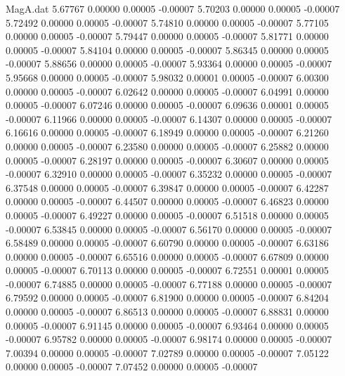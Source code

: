 \begin{filecontents}{MagA.dat}
   5.67767    0.00000    0.00005   -0.00007
   5.70203    0.00000    0.00005   -0.00007
   5.72492    0.00000    0.00005   -0.00007
   5.74810    0.00000    0.00005   -0.00007
   5.77105    0.00000    0.00005   -0.00007
   5.79447    0.00000    0.00005   -0.00007
   5.81771    0.00000    0.00005   -0.00007
   5.84104    0.00000    0.00005   -0.00007
   5.86345    0.00000    0.00005   -0.00007
   5.88656    0.00000    0.00005   -0.00007
   5.93364    0.00000    0.00005   -0.00007
   5.95668    0.00000    0.00005   -0.00007
   5.98032    0.00001    0.00005   -0.00007
   6.00300    0.00000    0.00005   -0.00007
   6.02642    0.00000    0.00005   -0.00007
   6.04991    0.00000    0.00005   -0.00007
   6.07246    0.00000    0.00005   -0.00007
   6.09636    0.00001    0.00005   -0.00007
   6.11966    0.00000    0.00005   -0.00007
   6.14307    0.00000    0.00005   -0.00007
   6.16616    0.00000    0.00005   -0.00007
   6.18949    0.00000    0.00005   -0.00007
   6.21260    0.00000    0.00005   -0.00007
   6.23580    0.00000    0.00005   -0.00007
   6.25882    0.00000    0.00005   -0.00007
   6.28197    0.00000    0.00005   -0.00007
   6.30607    0.00000    0.00005   -0.00007
   6.32910    0.00000    0.00005   -0.00007
   6.35232    0.00000    0.00005   -0.00007
   6.37548    0.00000    0.00005   -0.00007
   6.39847    0.00000    0.00005   -0.00007
   6.42287    0.00000    0.00005   -0.00007
   6.44507    0.00000    0.00005   -0.00007
   6.46823    0.00000    0.00005   -0.00007
   6.49227    0.00000    0.00005   -0.00007
   6.51518    0.00000    0.00005   -0.00007
   6.53845    0.00000    0.00005   -0.00007
   6.56170    0.00000    0.00005   -0.00007
   6.58489    0.00000    0.00005   -0.00007
   6.60790    0.00000    0.00005   -0.00007
   6.63186    0.00000    0.00005   -0.00007
   6.65516    0.00000    0.00005   -0.00007
   6.67809    0.00000    0.00005   -0.00007
   6.70113    0.00000    0.00005   -0.00007
   6.72551    0.00001    0.00005   -0.00007
   6.74885    0.00000    0.00005   -0.00007
   6.77188    0.00000    0.00005   -0.00007
   6.79592    0.00000    0.00005   -0.00007
   6.81900    0.00000    0.00005   -0.00007
   6.84204    0.00000    0.00005   -0.00007
   6.86513    0.00000    0.00005   -0.00007
   6.88831    0.00000    0.00005   -0.00007
   6.91145    0.00000    0.00005   -0.00007
   6.93464    0.00000    0.00005   -0.00007
   6.95782    0.00000    0.00005   -0.00007
   6.98174    0.00000    0.00005   -0.00007
   7.00394    0.00000    0.00005   -0.00007
   7.02789    0.00000    0.00005   -0.00007
   7.05122    0.00000    0.00005   -0.00007
   7.07452    0.00000    0.00005   -0.00007

\end{filecontents}
